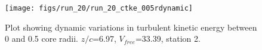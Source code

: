 \begin{figure}[H]
\centering
\texttt{[image: figs/run\_20/run\_20\_ctke\_005rdynamic]}
\caption{Plot showing dynamic variations in turbulent kinetic energy between 0 and 0.5 core radii. $z/c$=6.97, $V_{free}$=33.39, station 2.}
\label{fig:run_20_ctke_005rdynamic}
\end{figure}


